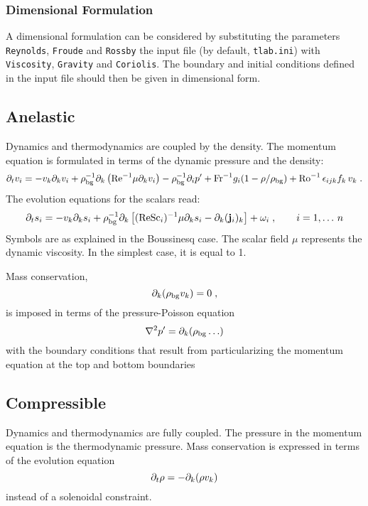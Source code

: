 \subsubsection{Dimensional Formulation}

A dimensional formulation can be considered by substituting the parameters \texttt{Reynolds}, \texttt{Froude} and \texttt{Rossby} the input file (by default, \texttt{tlab.ini}) with \texttt{Viscosity}, \texttt{Gravity} and \texttt{Coriolis}. The boundary and initial conditions defined in the input file should then be given in dimensional form. 

\subsection{Anelastic}

Dynamics and thermodynamics are coupled by the density. The momentum equation is formulated in terms of the dynamic pressure and the density:
\begin{equation}
    \partial_t v_i = -v_k\partial_k v_i + \rho_\mathrm{bg}^{-1}\partial_k\left(\mathrm{Re}^{-1} \mu \partial_k v_i\right) -\rho_\mathrm{bg}^{-1}\partial_i p'
        +\mathrm{Fr}^{-1} g_i(1-\rho/\rho_\mathrm{bg})+\mathrm{Ro}^{-1}\,\epsilon_{ijk} f_k\,v_k\;.
\end{equation}
The evolution equations for the scalars read:
\begin{equation}
    \partial_t s_i  = -v_k\partial_k s_i +\rho_\mathrm{bg}^{-1}\partial_k \left[(\mathrm{Re}\mathrm{Sc}_i)^{-1} \mu \partial_k s_i -\partial_k (\mathbf{j}_i)_k\right] + \omega_i \;, \qquad i = 1,\ldots\,n
\end{equation}
Symbols are as explained in the Boussinesq case. The scalar field $\mu$ represents the dynamic viscosity. In the simplest case, it is equal to 1.
\par
Mass conservation,
\begin{equation}
    \partial_k (\rho_\mathrm{bg} v_k)=0\;,
\end{equation}
is imposed in terms of the pressure-Poisson equation
\begin{equation}
    \nabla^2 p'=\partial_k(\rho_\mathrm{bg} \ldots)
\end{equation}
with the boundary conditions that result from particularizing the momentum equation at the top and bottom boundaries

\subsection{Compressible}

Dynamics and thermodynamics are fully coupled. The pressure in the momentum equation is the thermodynamic pressure. Mass conservation is expressed in terms of the evolution equation
\begin{equation}
    \partial_t \rho = -\partial_k(\rho v_k) 
\end{equation}
instead of a solenoidal constraint.

